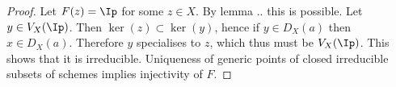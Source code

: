 \begin{proof}
Let $F(z)=\Ip$ for some $z\in X$. By lemma .. this is possible.
Let $y\in V_X(\Ip)$. Then $\ker(z)\subset \ker(y)$, hence if $y\in D_X(a)$ then $x\in D_X(a)$.
Therefore $y$ specialises to $z$, which thus must be $V_X(\Ip)$. This shows that it is irreducible.
Uniqueness of generic points of closed irreducible subsets of schemes implies injectivity of $F$.
\begin{comment}
Let $U \cup V = V_X(\Ip)$ with $U,V$ closed. 
The inclusions $u,v$ of closed sets $U,V$ is a quasi-compact map, because a closed set of a quasi-compact is quasi-compact. 
Therefore $u_*,v_*$ sends quasi-coherent modules to quasi-coherent modules [Reference].

Let $\sheaf{I},\sheaf{J}$ be the ideal sheaves corresponding to the reduced induced subscheme structure $(U,\sheaf{O}_U),(V,\sheaf{O}_V)$
on the closed sets $U$ and $V$. Hence the sequences
\[\sheaf{I}\rightarrow \sheaf{O}_X \rightarrow u_*(\sheaf{O}_U)\rightarrow 0,\]
\[\sheaf{J}\rightarrow \sheaf{O}_X \rightarrow v_*(\sheaf{O}_V)\rightarrow 0\]
are exact and so $\sheaf{I},\sheaf{J}$ are quasi-coherent.
Let $I,J$ be the global sections of $\sheaf{I}$ and $\sheaf{J}$.
Because of our adjoint equivalence $\Lambda_X(I)=\sheaf{I}$ and $\Lambda_X(J)=\sheaf{J}$, hence also $U=V_X(I)$ and $V=V_X(J)$.
We now have $V_X(IJ)=V_X(\Ip)$.
Moreover $\Lambda_X(\frac{\sheaf{O}(X)}{I}) \iso \frac{\sheaf{O}}{\sheaf{I}} \iso u_*(\sheaf{O}_U)$ and similar for $J,v,V$.
Since $\sheaf{O}_U$ is a reduced sheaf, $\sheaf{I}(W)$ is radical for every open $W \subset X$.

Now invoke the previous lemma for both inclusions wrt $IJ$ and $\Ip$. 
This yields $I\cap J = \Ip$, hence $I=\Ip$ or $J=\Ip$.
Now one of the closed sets $U,V$ is the whole of $V_X(\Ip)$.
\end{comment}
\end{proof}
